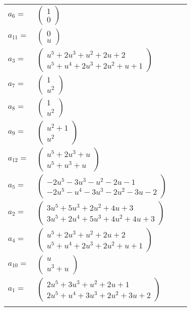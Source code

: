 \documentclass[1p]{elsarticle_modified}
\theoremstyle{definition}
\begin{document}
\begin{tabular}{m{7pt} m{180pt} m{7pt} m{180pt} }
\flushright $a_{6}=$&$\begin{pmatrix}1\\0\end{pmatrix}$ \\
\flushright $a_{11}=$&$\begin{pmatrix}0\\u\end{pmatrix}$ \\
\flushright $a_{3}=$&$\begin{pmatrix}u^5+2 u^3+u^2+2 u+2\\u^5+u^4+2 u^3+2 u^2+u+1\end{pmatrix}$ \\
\flushright $a_{7}=$&$\begin{pmatrix}1\\u^2\end{pmatrix}$ \\
\flushright $a_{8}=$&$\begin{pmatrix}1\\u^2\end{pmatrix}$ \\
\flushright $a_{9}=$&$\begin{pmatrix}u^2+1\\u^2\end{pmatrix}$ \\
\flushright $a_{12}=$&$\begin{pmatrix}u^5+2 u^3+u\\u^5+u^3+u\end{pmatrix}$ \\
\flushright $a_{5}=$&$\begin{pmatrix}-2 u^5-3 u^3- u^2-2 u-1\\-2 u^5- u^4-3 u^3-2 u^2-3 u-2\end{pmatrix}$ \\
\flushright $a_{2}=$&$\begin{pmatrix}3 u^5+5 u^3+2 u^2+4 u+3\\3 u^5+2 u^4+5 u^3+4 u^2+4 u+3\end{pmatrix}$ \\
\flushright $a_{4}=$&$\begin{pmatrix}u^5+2 u^3+u^2+2 u+2\\u^5+u^4+2 u^3+2 u^2+u+1\end{pmatrix}$ \\
\flushright $a_{10}=$&$\begin{pmatrix}u\\u^3+u\end{pmatrix}$ \\
\flushright $a_{1}=$&$\begin{pmatrix}2 u^5+3 u^3+u^2+2 u+1\\2 u^5+u^4+3 u^3+2 u^2+3 u+2\end{pmatrix}$\\&\end{tabular}
\end{document}
